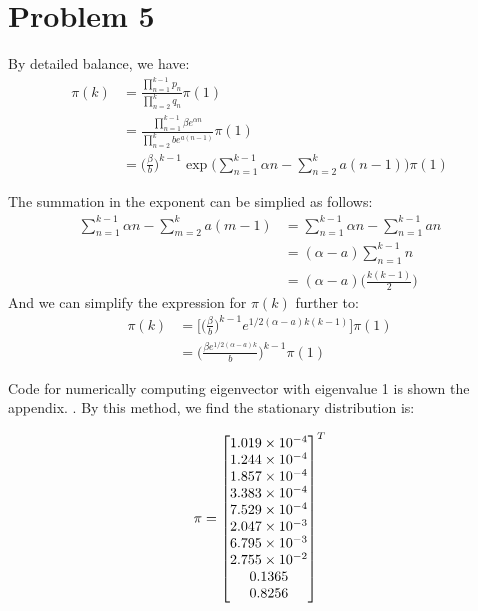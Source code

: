 \documentclass{homework}
\begin{document}
\section{Problem 5}

\begin{letterenum}
\item By detailed balance, we have:
\begin{align*}
    \pi(k) &= \frac{\prod_{n=1}^{k-1} p_n}{\prod_{n=2}^k q_n} \pi(1) \\
        &= \frac{\prod_{n=1}^{k-1} \beta e^{\alpha n}}{\prod_{n=2}^k b e^{a(n-1)}} \pi(1) \\
        &= \biggl(\frac{\beta}{b}\biggr)^{k-1} \exp\biggl(
            \sum_{n=1}^{k-1} \alpha n - \sum_{n=2}^k a(n-1)
        \biggr) \pi(1)
\end{align*}

The summation in the exponent can be simplied as follows:
\begin{align*}
    \sum_{n=1}^{k-1} \alpha n - \sum_{m=2}^{k} a(m-1) 
        &= \sum_{n=1}^{k-1} \alpha n - \sum_{n=1}^{k-1} an \\
        &= (\alpha - a) \sum_{n=1}^{k-1} n \\
        &= (\alpha - a) \biggl(\frac{k(k-1)}{2}\biggr)
\end{align*}
And we can simplify the expression for $\pi(k)$ further to:
\begin{align*}
    \pi(k) &= \biggl[
        \biggl(\frac{\beta}{b}\biggr)^{k-1}
        e^{1/2 (\alpha - a)k(k-1)}
    \biggr] \pi(1) \\
    &= \biggl(
        \frac{\beta e^{1/2 (\alpha - a)k}}{b}
    \biggr)^{k-1} \pi(1)
\end{align*}

\item Code for numerically computing eigenvector with eigenvalue 1
is shown the appendix. .  By this method, we find the stationary distribution
is:

    
\begin{equation*}
    \pi = \begin{bmatrix} 
            1.019\times 10^{-4} \\ 1.244\times 10^{-4} \\ 1.857\times 10^{-4}
            \\ 3.383\times 10^{-4} \\ 7.529\times 10^{-4} \\
            2.047\times 10^{-3} \\ 6.795\times 10^{-3}
            \\ 2.755\times 10^{-2} \\ 0.1365 \\ 0.8256
             \end{bmatrix}^T
\end{equation*}


\end{letterenum}
\end{document}

